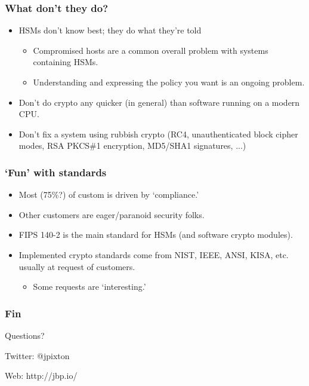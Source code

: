 \documentclass{beamer}
\begin{document}
\frame
{
  \frametitle{What don't they do?}

  \begin{itemize}
    \item<1-> HSMs don't know best; they do what they're told
    \begin{itemize}
      \item<2-> Compromised hosts are a common overall problem with systems containing HSMs.
                

      \item<4-> Understanding and expressing the policy you want is an ongoing problem.
    \end{itemize}

    \item<5-> Don't do crypto any quicker (in general) than software running on a modern CPU.
    \item<6-> Don't fix a system using rubbish crypto (RC4, unauthenticated block cipher modes, RSA PKCS\#1 encryption, MD5/SHA1 signatures, ...)
  \end{itemize}
}

\frame
{
  \frametitle{`Fun' with standards}

  \begin{itemize}
    \item<1-> Most (75\%?) of custom is driven by `compliance.'
    \item<2-> Other customers are eager/paranoid security folks.
  \end{itemize}

  \begin{itemize}
    \item<3-> FIPS 140-2 is the main standard for HSMs (and software crypto modules).
    \item<4-> Implemented crypto standards come from NIST, IEEE, ANSI, KISA, etc. usually at request of customers.
      \begin{itemize}
        \item<5-> Some requests are `interesting.'
      \end{itemize}
  \end{itemize}
}

\frame
{
  \frametitle{Fin}
  Questions?

  \vspace{5em}

  Twitter: @jpixton
  
  Web: http://jbp.io/
}
\end{document}
